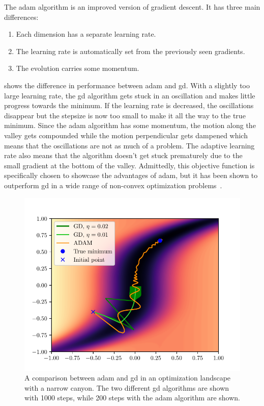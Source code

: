The \gls{adam} algorithm is an improved version of gradient descent.
It has three main differences:
\begin{enumerate}
	\item Each dimension has a separate learning rate.
	\item The learning rate is automatically set from the previously seen gradients.
	\item The evolution carries some momentum.
\end{enumerate}
 shows the difference in performance between \gls{adam}
and \gls{gd}.
With a slightly too large learning rate, the \gls{gd} algorithm gets stuck in an
oscillation and makes little progress towards the minimum.
If the learning rate is decreased, the oscillations disappear but the stepsize
is now too small to make it all the way to the true minimum.
Since the \gls{adam} algorithm has some momentum, the motion along the valley
gets compounded while the motion perpendicular gets dampened which means that
the oscillations are not as much of a problem.
The adaptive learning rate also means that the algorithm doesn't get stuck
prematurely due to the small gradient at the bottom of the valley.
Admittedly, this objective function is specifically chosen to showcase the
advantages of \gls{adam}, but it has been shown to outperform \gls{gd} in a wide
range of non-convex optimization problems~\cite{kingma2017adam}.
\begin{figure}[htpb]
	\centering
	\includegraphics{chapters/theory/adam_vs_gd_plot.pdf}
	\caption{
		A comparison between \gls{adam} and \gls{gd} in an optimization
		landscape with a narrow canyon. The two different \gls{gd} algorithms
		are shown with 1000 steps, while 200 steps with the \gls{adam} algorithm
		are shown.
	}
	\label{fig:adam_vs_gd}
\end{figure}

